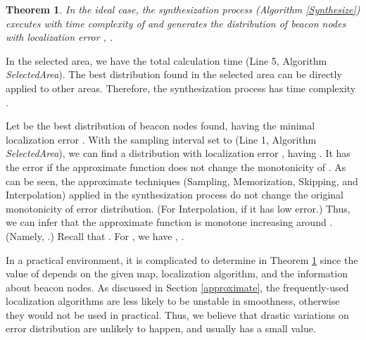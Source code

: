 \documentclass[10pt, conference, letterpaper]{IEEEtran}
\newtheorem{thm}{Theorem}
\begin{document}
\begin{thm} \label{thm_synthesize}
In the ideal case, the synthesization process (Algorithm \ref{Synthesize}) executes with time complexity of  and generates the distribution of beacon nodes with localization error , .
\end{thm}
\begin{IEEEproof}
In the selected area, we have the total calculation time  (Line 5, Algorithm \textit{SelectedArea}). The best distribution found in the selected area can be directly applied to other areas. Therefore, the synthesization process has time complexity .

Let  be the best distribution of beacon nodes found, having the minimal localization error . With the sampling interval set to  (Line 1, Algorithm \textit{SelectedArea}), we can find a distribution  with localization error , having . It has the error  if the approximate function  does not change the monotonicity of . As can be seen, the approximate techniques (Sampling, Memorization, Skipping, and Interpolation) applied in the synthesization process do not change the original monotonicity of error distribution. (For Interpolation, if it has low error.) Thus, we can infer that the approximate function  is monotone increasing around . (Namely, .) Recall that . For , we have , .
\end{IEEEproof}

In a practical environment, it is complicated to determine  in Theorem \ref{thm_synthesize} since the value of  depends on the given map, localization algorithm, and the information about beacon nodes. As discussed in Section \ref{approximate}, the frequently-used localization algorithms are less likely to be unstable in smoothness, otherwise they would not be used in practical. Thus, we believe that drastic variations on error distribution are unlikely to happen, and  usually has a small value.
\end{document}
